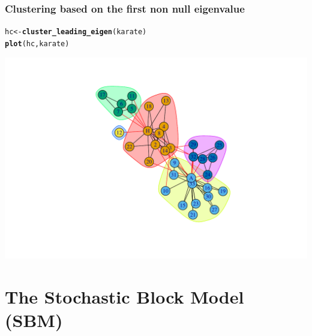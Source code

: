 \documentclass{beamer}\usepackage[]{graphicx}\usepackage[]{color}
\makeatletter
\newcommand{\hlstd}[1]{\textcolor[rgb]{0.345,0.345,0.345}{#1}}%
\newcommand{\hlkwb}[1]{\textcolor[rgb]{0.69,0.353,0.396}{#1}}%
\newcommand{\hlkwd}[1]{\textcolor[rgb]{0.737,0.353,0.396}{\textbf{#1}}}%
\newenvironment{kframe}{%
 \def\at@end@of@kframe{}%
 \ifinner\ifhmode%
  \def\at@end@of@kframe{\end{minipage}}%
  \begin{minipage}{\columnwidth}%
 \fi\fi%
 \def\FrameCommand##1{\hskip\@totalleftmargin \hskip-\fboxsep
 \colorbox{shadecolor}{##1}\hskip-\fboxsep
     \hskip-\linewidth \hskip-\@totalleftmargin \hskip\columnwidth}%
 \MakeFramed {\advance\hsize-\width
   \@totalleftmargin\z@ \linewidth\hsize
   \@setminipage}}%
 {\par\unskip\endMakeFramed%
 \at@end@of@kframe}
\newenvironment{knitrout}{}{} %
\makeatother
\begin{document}
% 
% 
% 
% 

\begin{frame}[fragile]
  \frametitle{Clustering based on the first non null eigenvalue}
  
\begin{knitrout}\scriptsize
{}\color{fgcolor}\begin{kframe}
\begin{alltt}
\hlstd{hc} \hlkwb{<-} \hlkwd{cluster_leading_eigen}\hlstd{(karate)}
\hlkwd{plot}\hlstd{(hc,karate)}
\end{alltt}
\end{kframe}
\includegraphics[width=.8\textwidth]{figures/unnamed-chunk-5-1} 

\end{knitrout}

\end{frame}

\section{The Stochastic Block Model (SBM)}
\end{document}
